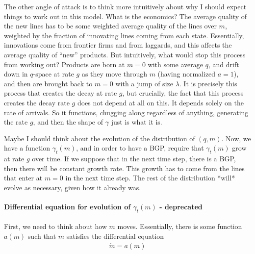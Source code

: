 \documentclass[12pt,english]{article}
\theoremstyle{remark}
\begin{document}
The other angle of attack is to think more intuitively about why I should expect things to work out in this model. What is the economics? The average quality of the new lines has to be some weighted average quality of the lines over $m$, weighted by the fraction of innovating lines coming from each state. Essentially, innovations come from frontier firms and from laggards, and this affects the average quality of ``new'' products. But intuitively, what would stop this process from working out? Products are born at $m = 0$ with some average $q$, and drift down in $q$-space at rate $g$ as they move through $m$ (having normalized $a = 1$), and then are brought back to $m = 0$ with a jump of size $\lambda$. It is precisely this process that creates the decay at rate $g$, but crucially, the fact that this process creates the decay rate $g$ does not depend at all on this. It depends solely on the rate of arrivals. So it functions, chugging along regardless of anything, generating the rate $g$, and then the shape of $\gamma$ just is what it is.

Maybe I should think about the evolution of the distribution of $(q,m)$. Now, we have a function $\gamma_t(m)$, and in order to have a BGP, require that $\gamma_t(m)$ grow at rate $g$ over time. If we suppose that in the next time step, there is a BGP, then there will be constant growth rate. This growth has to come from the lines that enter at $m=0$ in the next time step. The rest of the distribution *will* evolve as necessary, given how it already was. 


















\pagebreak









\paragraph{Differential equation for evolution of $\gamma_t(m)$ - deprecated}
First, we need to think about how $m$ moves. Essentially, there is some function $a(m)$ such that $m$ satisfies the differential equation 
\begin{align*}
\dot{m} = a(m)
\end{align*} 
\end{document}
